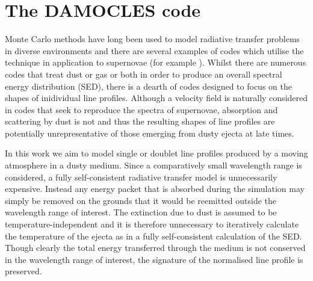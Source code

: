 \documentclass[useAMS,usenatbib,usegraphicx]{mnras}
\begin{document}




\section{The DAMOCLES code}
\label{code}

Monte Carlo methods have long been used to model radiative transfer 
problems in diverse environments and there are several examples of codes 
which utilise the technique in application to supernovae 
(for example \citet{Maeda2003, Lucy2005c, Jerkstrand2012,Owen2015}).  Whilst there are numerous codes that 
treat dust or gas or both in order to produce an overall spectral energy 
distribution (SED), there is a dearth of codes designed to focus on the 
shapes of inidividual line profiles.  Although a velocity field is naturally 
considered in codes that seek to reproduce the spectra of supernovae, 
absorption and scattering by dust is not and thus the resulting shapes of 
line profiles are potentially unrepresentative of those emerging from 
dusty ejecta at late times.

In this work we aim to model single or doublet line profiles produced by 
a moving atmosphere in a dusty medium.  
Since a comparatively small wavelength range is considered, a fully 
self-consistent radiative transfer model is unnecessarily expensive.  
Instead any energy packet that is absorbed during the simulation may 
simply be removed on the grounds that it would be 
reemitted outside the wavelength range of interest. The extinction due to 
dust is assumed to be temperature-independent and it is therefore 
unnecessary to iteratively calculate the temperature of the ejecta as in a 
fully self-consistent calculation of the SED.  Though clearly the total 
energy transferred through the medium is not conserved in the wavelength range of interest, the signature of 
the normalised line profile is preserved.
\end{document}
